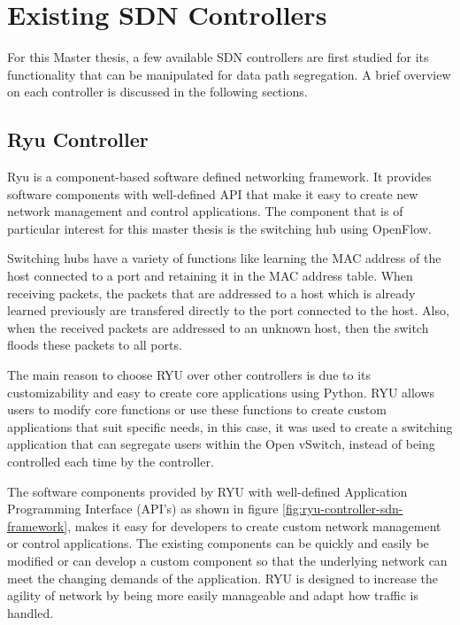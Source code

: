 \section{Existing SDN Controllers}\label{existing_sdn_controllers}
For this Master thesis, a few available SDN controllers are first studied for its functionality that can be manipulated for data path segregation. A brief overview on each controller is discussed in the following sections.
\subsection{Ryu Controller \cite{RYU_Switching_Hub}}\label{ryu_controller}
Ryu is a component-based software defined networking framework. It provides software components with well-defined \gls{API} that make it easy to create new network management and control applications. The component that is of particular interest for this master thesis is the switching hub using OpenFlow.

Switching hubs have a variety of functions like learning the MAC address of the host connected to a port and retaining it in the MAC address table. When receiving packets, the packets that are addressed to a host which is already learned previously are transfered directly to the port connected to the host. Also, when the received packets are addressed to an unknown host, then the switch floods these packets to all ports.




The main reason to choose RYU over other controllers is due to its customizability and easy to create core applications using Python. RYU allows users to modify core functions or use these functions to create custom applications that suit specific needs, in this case, it was used to create a switching application that can segregate users within the Open vSwitch, instead of being controlled each time by the controller.

The software components provided by RYU with well-defined Application Programming Interface (API’s) as shown in figure \ref{fig:ryu-controller-sdn-framework}, makes it easy for developers to create custom network management or control applications. The existing components can be quickly and easily be modified or can develop a custom component so that the underlying network can meet the changing demands of the application. RYU is designed to increase the agility of network by being more easily manageable and adapt how traffic is handled.

